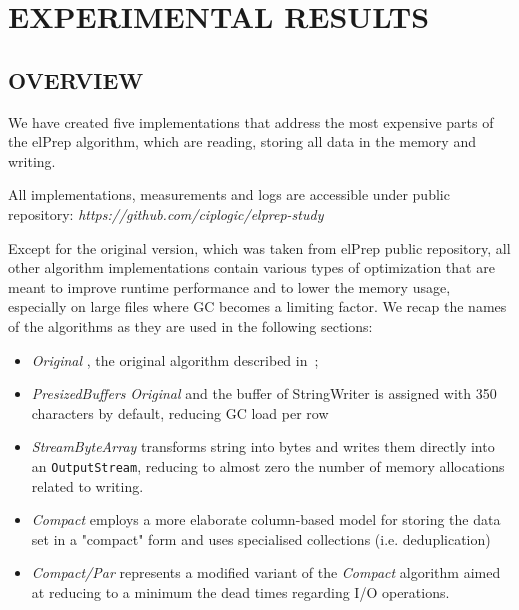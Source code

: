 \documentclass[a4paper,twoside]{article}
\begin{document}
\section{\uppercase{Experimental Results}}
\label{sec:results}

\subsection{\uppercase{Overview}}
\label{subsec:overview}

We have created five implementations that address the most expensive parts of the elPrep algorithm, which are reading, storing all data in the memory and writing.

All implementations, measurements and logs are accessible under public repository: {\textit{https://github.com/ciplogic/elprep-study}}

Except for the original version, which was taken from elPrep public repository, all other algorithm implementations contain various types of optimization that are meant to improve runtime performance and to lower the memory usage, especially on large files where GC becomes a limiting factor. 
We recap the names of the algorithms as they are used in the following sections:
\begin{itemize}
\item {\textit{Original} }, the original algorithm described in~\cite{costanza:2019};

\item {\textit{PresizedBuffers} } {\textit{Original}} and the buffer of StringWriter is assigned with 350 characters by default, reducing GC load per row

\item {\textit{StreamByteArray} } transforms string into bytes and writes them directly into an \texttt{OutputStream}, reducing to almost zero the number of memory allocations related to writing.

\item {\textit{Compact} } employs a more elaborate column-based model for storing the data set in a "compact" form and uses specialised collections (i.e. deduplication)

\item {\textit{Compact/Par} } represents a modified variant of the {\textit{Compact} } algorithm aimed at reducing to a minimum the dead times regarding I/O operations.

\end{itemize}
\end{document}
